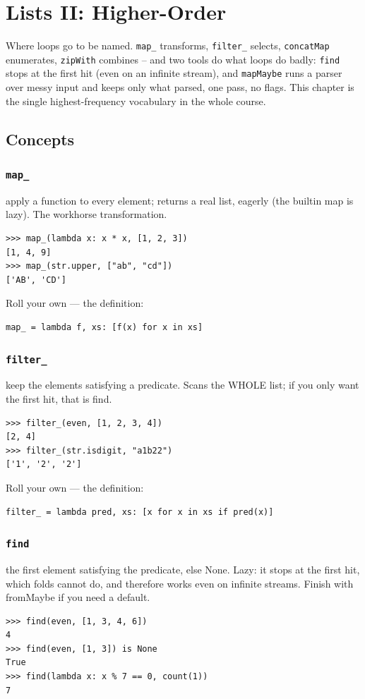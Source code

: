 \documentclass[10pt,letterpaper]{book}
\begin{document}
\chapter{Lists II: Higher-Order}

Where loops go to be named. \texttt{map\_} transforms, \texttt{filter\_}
selects, \texttt{concatMap} enumerates, \texttt{zipWith} combines --
and two tools do what loops do badly: \texttt{find} stops at the first hit
(even on an infinite stream), and \texttt{mapMaybe} runs a parser over messy
input and keeps only what parsed, one pass, no flags. This chapter is the
single highest-frequency vocabulary in the whole course.
\section{Concepts}
\subsection{\texttt{map\_}}\label{def:map-}
apply a function to every element; returns a real list, eagerly (the builtin map is lazy). The workhorse transformation.
\begin{lstlisting}[style=ex]
>>> map_(lambda x: x * x, [1, 2, 3])
[1, 4, 9]
>>> map_(str.upper, ["ab", "cd"])
['AB', 'CD']
\end{lstlisting}

Roll your own --- the definition:

\begin{lstlisting}[style=ex]
map_ = lambda f, xs: [f(x) for x in xs]
\end{lstlisting}
\subsection{\texttt{filter\_}}\label{def:filter-}
keep the elements satisfying a predicate. Scans the WHOLE list; if you only want the first hit, that is find.
\begin{lstlisting}[style=ex]
>>> filter_(even, [1, 2, 3, 4])
[2, 4]
>>> filter_(str.isdigit, "a1b22")
['1', '2', '2']
\end{lstlisting}

Roll your own --- the definition:

\begin{lstlisting}[style=ex]
filter_ = lambda pred, xs: [x for x in xs if pred(x)]
\end{lstlisting}
\subsection{\texttt{find}}\label{def:find}
the first element satisfying the predicate, else None. Lazy: it stops at the first hit, which folds cannot do, and therefore works even on infinite streams. Finish with fromMaybe if you need a default.
\begin{lstlisting}[style=ex]
>>> find(even, [1, 3, 4, 6])
4
>>> find(even, [1, 3]) is None
True
>>> find(lambda x: x % 7 == 0, count(1))
7
\end{lstlisting}
\end{document}
